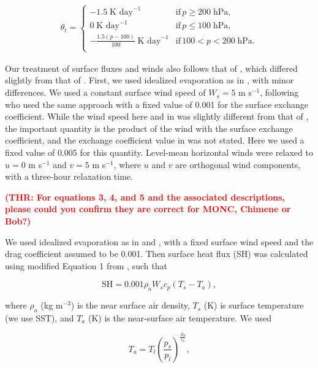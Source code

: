 \documentclass[draft]{agujournal2019}
\newcommand{\todo}[1]{\textcolor{red}{\textbf{(#1)}}}
\begin{document}
\begin{align}
 \theta_t = \begin{cases}
    -1.5\; \textrm{K day}^{-1} & \textrm{if}\, p \geq 200\; \textrm{hPa}, \\
    0\; \textrm{K day}^{-1} & \textrm{if}\, p \leq 100\; \textrm{hPa}, \\
    -\frac{1.5 (p-100)}{100}\; \textrm{K day}^{-1} & \textrm{if}\, 
    100 < p < 200\; \textrm{hPa}. \\
 \end{cases}
\end{align}

Our treatment of surface fluxes and winds also follows that of
, which differed slightly from that of
. First, we used idealized evaporation as in
, with minor differences. We used a constant surface wind
speed of $W_s = 5$ m s$^{-1}$, following  who used the
same approach with a fixed value of 0.001 for the surface exchange coefficient.
While the wind speed here and in  was slightly different
from that of , the important quantity is the product of
the wind with the surface exchange coefficient, and the exchange coefficient
value in  was not stated. Here we used a fixed value of
0.005 for this quantity. Level-mean horizontal winds were relaxed to $u = 0$ m
s$^{-1}$ and $v = 5$ m s$^{-1}$, where $u$ and $v$ are orthogonal wind
components, with a three-hour relaxation time.

\todo{THR: For equations 3, 4, and 5 and the associated descriptions, please
could you confirm they are correct for MONC, Chimene or Bob?}

We used idealized evaporation as in  and
, with a fixed surface wind speed and the drag
coefficient assumed to be 0.001. Then surface heat flux (SH) was calculated
using modified Equation 1 from , such that

\begin{equation}
\textrm{SH} = 0.001 \rho_a W_s c_p (T_s - T_a),
\end{equation}

\noindent where $\rho_a$ (kg m$^{-3}$) is the near surface air density, $T_s$
(K) is surface temperature (we use SST), and $T_a$ (K) is the near-surface air
temperature. We used 

\begin{equation}
T_a = T_l \left(\frac{p_s}{p_l}\right)^{\frac{R_d}{c_p}},
\end{equation}
\end{document}
